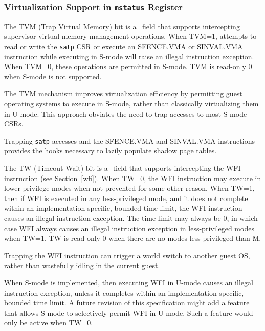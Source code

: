 \subsubsection{Virtualization Support in {\tt mstatus} Register}
\label{virt-control}

The TVM (Trap Virtual Memory) bit is a \warl\ field that supports intercepting
supervisor virtual-memory management operations.  When TVM=1,
attempts to read or write the {\tt satp} CSR or execute an SFENCE.VMA or
SINVAL.VMA instruction while executing in S-mode will raise an illegal instruction
exception.  When TVM=0, these operations are permitted in S-mode.
TVM is read-only 0 when S-mode is not supported.

\begin{commentary}
The TVM mechanism improves virtualization efficiency by permitting guest
operating systems to execute in S-mode, rather than classically virtualizing
them in U-mode.  This approach obviates the need to trap accesses to most
S-mode CSRs.

Trapping {\tt satp} accesses and the SFENCE.VMA and SINVAL.VMA instructions
provides the hooks necessary to lazily populate shadow page tables.
\end{commentary}

The TW (Timeout Wait) bit is a \warl\ field that supports intercepting the WFI
instruction (see Section~\ref{wfi}).
When TW=0, the WFI instruction may execute in lower
privilege modes when not prevented for some other reason.  When TW=1,
then if WFI is executed in any less-privileged mode, and it does not complete
within an implementation-specific, bounded time limit, the WFI instruction
causes an illegal instruction exception.  The time limit may always be 0, in which
case WFI always causes an illegal instruction exception in less-privileged modes
when TW=1.  TW is read-only 0 when there are no modes less privileged than
M.

\begin{commentary}
Trapping the WFI
instruction can trigger a world switch to another guest OS, rather than
wastefully idling in the current guest.
\end{commentary}

When S-mode is implemented, then executing WFI in U-mode causes an illegal
instruction exception, unless it completes within an implementation-specific,
bounded time limit.  A future revision of this specification might add
a feature that allows S-mode to selectively permit WFI in U-mode.  Such
a feature would only be active when TW=0.

